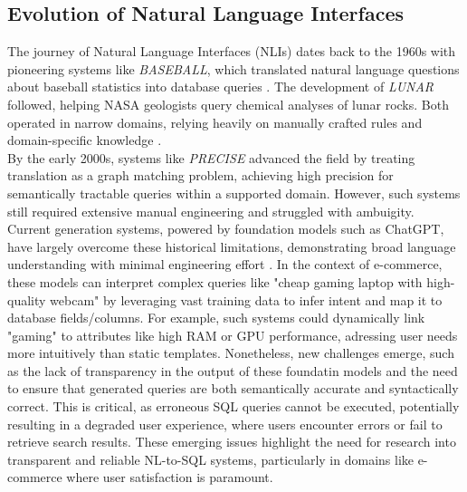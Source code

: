 \documentclass[../../submission.tex]{subfiles}
\begin{document}
\subsection{Evolution of Natural Language Interfaces}
The journey of Natural Language Interfaces (NLIs) dates back to the 1960s with pioneering
systems like \textit{BASEBALL}, which translated natural language questions about baseball 
statistics into database queries \cite{greenBaseballAutomaticQuestionanswerer1961}. 
The development of \textit{LUNAR} \cite{woods1973progress} followed, helping NASA geologists query chemical analyses of lunar rocks.
Both operated in narrow domains, relying heavily on manually crafted rules and domain-specific knowledge \cite{popescuEtalTowardsTheoryOfNaturalLanguage}.
\\
By the early 2000s, systems like \textit{PRECISE} advanced the field by treating translation as a 
graph matching problem, achieving high precision for semantically tractable queries within a supported 
domain. However, such systems still required extensive manual engineering
and struggled with ambuigity.
\\
Current generation systems, powered by foundation models such as ChatGPT, 
have largely overcome these historical limitations, demonstrating broad 
language understanding with minimal engineering effort \cite{raffelExploringLimitsTransfer2023}.
In the context of e-commerce, these models can interpret complex queries like "cheap 
gaming laptop with high-quality webcam" by leveraging vast training data to infer 
intent and map it to database fields/columns. For example, such systems could dynamically link
"gaming" to attributes like high RAM or GPU performance, adressing user needs more intuitively
than static templates. Nonetheless, new challenges emerge, such as the lack of transparency 
in the output of these foundatin models and the need to ensure that generated queries are both 
semantically accurate and syntactically correct.
This is critical, as erroneous SQL queries cannot be executed, potentially resulting in a degraded user 
experience, where users encounter errors or fail to retrieve search results. These emerging issues 
highlight the need for research into transparent and reliable NL-to-SQL systems, particularly in domains 
like e-commerce where user satisfaction is paramount. 
\end{document}
